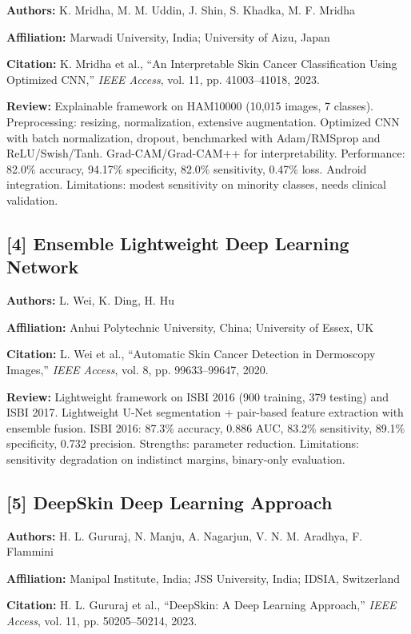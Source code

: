 \documentclass[10pt,twocolumn]{article}
\begin{document}
\textbf{Authors:} K. Mridha, M. M. Uddin, J. Shin, S. Khadka, M. F. Mridha

\textbf{Affiliation:} Marwadi University, India; University of Aizu, Japan

\textbf{Citation:} K. Mridha et al., ``An Interpretable Skin Cancer Classification Using Optimized CNN,'' \textit{IEEE Access}, vol. 11, pp. 41003--41018, 2023.

\textbf{Review:} Explainable framework on HAM10000 (10,015 images, 7 classes). Preprocessing: resizing, normalization, extensive augmentation. Optimized CNN with batch normalization, dropout, benchmarked with Adam/RMSprop and ReLU/Swish/Tanh. Grad-CAM/Grad-CAM++ for interpretability. Performance: 82.0\% accuracy, 94.17\% specificity, 82.0\% sensitivity, 0.47\% loss. Android integration. Limitations: modest sensitivity on minority classes, needs clinical validation.

\subsection*{[4] Ensemble Lightweight Deep Learning Network}

\textbf{Authors:} L. Wei, K. Ding, H. Hu

\textbf{Affiliation:} Anhui Polytechnic University, China; University of Essex, UK

\textbf{Citation:} L. Wei et al., ``Automatic Skin Cancer Detection in Dermoscopy Images,'' \textit{IEEE Access}, vol. 8, pp. 99633--99647, 2020.

\textbf{Review:} Lightweight framework on ISBI 2016 (900 training, 379 testing) and ISBI 2017. Lightweight U-Net segmentation + pair-based feature extraction with ensemble fusion. ISBI 2016: 87.3\% accuracy, 0.886 AUC, 83.2\% sensitivity, 89.1\% specificity, 0.732 precision. Strengths: parameter reduction. Limitations: sensitivity degradation on indistinct margins, binary-only evaluation.

\subsection*{[5] DeepSkin Deep Learning Approach}

\textbf{Authors:} H. L. Gururaj, N. Manju, A. Nagarjun, V. N. M. Aradhya, F. Flammini

\textbf{Affiliation:} Manipal Institute, India; JSS University, India; IDSIA, Switzerland

\textbf{Citation:} H. L. Gururaj et al., ``DeepSkin: A Deep Learning Approach,'' \textit{IEEE Access}, vol. 11, pp. 50205--50214, 2023.
\end{document}
